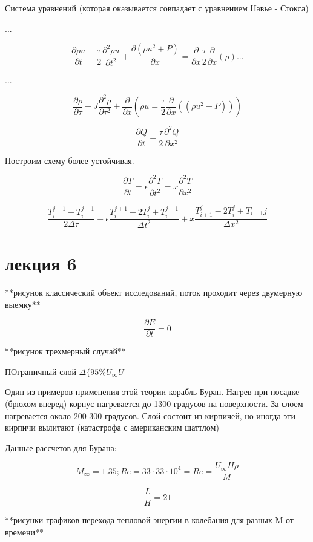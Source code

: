 \documentclass{article}
\begin{document}
Система уравнений (которая оказывается совпадает с уравнением Навье - Стокса)

...

\[ \frac{\partial \rho u }{\partial t} + \frac{\tau}{2} \frac{\partial^2 \rho u  }{\partial t^2} + \frac{\partial (\rho u^2 + P)}{\partial x} = \frac{\partial }{\partial x} \frac{\tau}{2} \frac{\partial }{\partial x} (\rho) ...\]

...



\[ \frac{\partial \rho}{\partial \tau} + J \frac{\partial^2 \rho}{\partial \tau^2} + \frac{\partial}{\partial x} (\rho u = \frac{\tau}{2} \frac{\partial }{\partial x } ((\rho u^2 + P)))  \]

\[ \frac{\partial Q }{\partial t } + \frac{\tau}{2} \frac{\partial^2 Q}{\partial x^2} \]

Построим схему более устойчивая.

\[ \frac{\partial T }{\partial t} = \epsilon \frac{\partial^2 T}{\partial t^2} = x \frac{\partial^2 T }{\partial x^2} \]

\[ \frac{T^{j+1}_{i} - T_i^{j-1}}{2 \Delta \tau} + \epsilon \frac{T_i^{j+1} - 2 T_i^j + T_i^{j-1}}{\Delta t^2} + x \frac{T^j_{i+1} - 2T_i^j+T_{i-1}{j}}{\Delta x^2} \]


\section{лекция 6}

**рисунок классический объект исследований, поток проходит через двумерную выемку**

\[ \frac{\partial E}{\partial t} = 0 \]

**рисунок трехмерный случай**

ПОграничный слой $ \Delta \{ 95\% U_\infty U $

Один из примеров применения этой теории корабль Буран. Нагрев при посадке (брюхом вперед) корпус нагревается до 1300 градусов на поверхности. За слоем нагревается около 200-300 градусов. Слой состоит из кирпичей, но иногда эти кирпичи вылитают (катастрофа с американским шаттлом)

Данные рассчетов для Бурана:

\[ M_\infty = 1.35; {Re} = 33\cdot 33\cdot 10^4 = Re = \frac{U_\infty H  \rho}{M}\]

\[ \frac{L}{H} = 21 \]

**рисунки графиков перехода тепловой энергии в колебания для разных M от времени**
\end{document}
